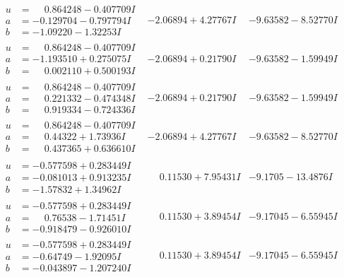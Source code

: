 \documentclass[1p]{elsarticle_modified}
\theoremstyle{definition}
\begin{document}
$$\begin{array}{c|c|c}
\begin{aligned}
u &= \phantom{-}0.864248 - 0.407709 I \\
a &= -0.129704 - 0.797794 I \\
b &= -1.09220 - 1.32253 I\end{aligned}
 & -2.06894 + 4.27767 I & -9.63582 - 8.52770 I \\ \hline\begin{aligned}
u &= \phantom{-}0.864248 - 0.407709 I \\
a &= -1.193510 + 0.275075 I \\
b &= \phantom{-}0.002110 + 0.500193 I\end{aligned}
 & -2.06894 + 0.21790 I & -9.63582 - 1.59949 I \\ \hline\begin{aligned}
u &= \phantom{-}0.864248 - 0.407709 I \\
a &= \phantom{-}0.221332 - 0.474348 I \\
b &= \phantom{-}0.919334 - 0.724336 I\end{aligned}
 & -2.06894 + 0.21790 I & -9.63582 - 1.59949 I \\ \hline\begin{aligned}
u &= \phantom{-}0.864248 - 0.407709 I \\
a &= \phantom{-}0.44322 + 1.73936 I \\
b &= \phantom{-}0.437365 + 0.636610 I\end{aligned}
 & -2.06894 + 4.27767 I & -9.63582 - 8.52770 I \\ \hline\begin{aligned}
u &= -0.577598 + 0.283449 I \\
a &= -0.081013 + 0.913235 I \\
b &= -1.57832 + 1.34962 I\end{aligned}
 & \phantom{-}0.11530 + 7.95431 I & -9.1705 - 13.4876 I \\ \hline\begin{aligned}
u &= -0.577598 + 0.283449 I \\
a &= \phantom{-}0.76538 - 1.71451 I \\
b &= -0.918479 - 0.926010 I\end{aligned}
 & \phantom{-}0.11530 + 3.89454 I & -9.17045 - 6.55945 I \\ \hline\begin{aligned}
u &= -0.577598 + 0.283449 I \\
a &= -0.64749 - 1.92095 I \\
b &= -0.043897 - 1.207240 I\end{aligned}
 & \phantom{-}0.11530 + 3.89454 I & -9.17045 - 6.55945 I \\ \hline\begin{aligned}

\end{aligned}
\end{array}$$
\end{document}
